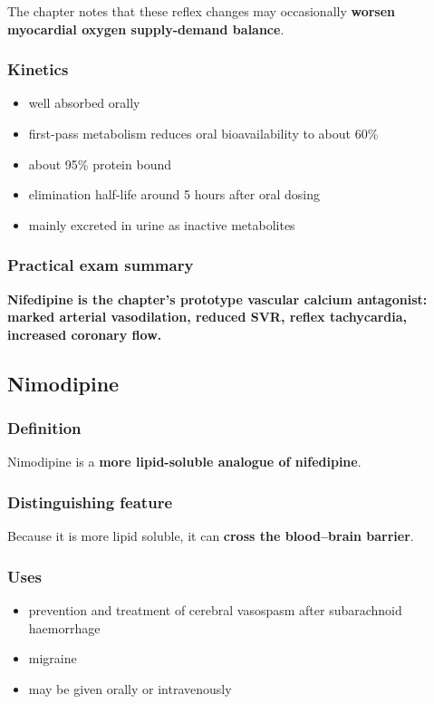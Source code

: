 \documentclass[11pt,a4paper]{article}
\begin{document}
The chapter notes that these reflex changes may occasionally \textbf{worsen myocardial oxygen supply-demand balance}.

\subsubsection*{Kinetics}
\begin{itemize}
    \item well absorbed orally
    \item first-pass metabolism reduces oral bioavailability to about 60\%
    \item about 95\% protein bound
    \item elimination half-life around 5 hours after oral dosing
    \item mainly excreted in urine as inactive metabolites
\end{itemize}

\subsubsection*{Practical exam summary}

\textbf{Nifedipine is the chapter's prototype vascular calcium antagonist: marked arterial vasodilation, reduced SVR, reflex tachycardia, increased coronary flow.}

\subsection{Nimodipine}

\subsubsection*{Definition}

Nimodipine is a \textbf{more lipid-soluble analogue of nifedipine}.

\subsubsection*{Distinguishing feature}

Because it is more lipid soluble, it can \textbf{cross the blood--brain barrier}.

\subsubsection*{Uses}
\begin{itemize}
    \item prevention and treatment of cerebral vasospasm after subarachnoid haemorrhage
    \item migraine
    \item may be given orally or intravenously
\end{itemize}
\end{document}
